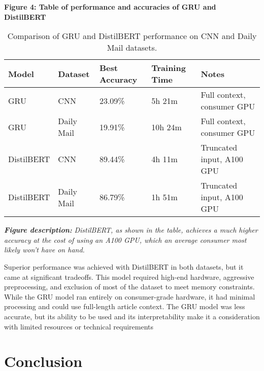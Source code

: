 \documentclass[11pt]{article}
\begin{document}
\begin{samepage}
	\begin{center}
		\textbf{Figure 4: Table of performance and accuracies of GRU and DistilBERT}
	\end{center}
	\begin{table}[h]
\begin{scriptsize}
\begin{tabularx}{\textwidth}{l l l l l}
\textbf{Model} & \textbf{Dataset} & \textbf{Best Accuracy} & \textbf{Training Time} & \textbf{Notes} \\
\hline
GRU & CNN & 23.09\% & 5h 21m & Full context, consumer GPU \\
GRU & Daily Mail & 19.91\% & 10h 24m & Full context, consumer GPU \\
DistilBERT & CNN & 89.44\% & 4h 11m & Truncated input, A100 GPU \\
DistilBERT & Daily Mail & 86.79\% & 1h 51m & Truncated input, A100 GPU \\
\end{tabularx}
\end{scriptsize}
\caption{Comparison of GRU and DistilBERT performance on CNN and Daily Mail datasets.}
\end{table}
\vspace{1em}
\noindent\begin{minipage}{0.9\linewidth}
\begin{scriptsize}
\textbf{\textit{Figure description:}} \textit{DistilBERT, as shown in the table, achieves a much higher accuracy at the cost of using an A100 GPU, which an average consumer most likely won't have on hand.}
\end{scriptsize}
\end{minipage}
\end{samepage}

    Superior performance was achieved with DistilBERT in both datasets, but
it came at significant tradeoffs. This model required high-end hardware,
aggressive preprocessing, and exclusion of most of the dataset to meet
memory constraints. While the GRU model ran entirely on consumer-grade
hardware, it had minimal processing and could use full-length article
context. The GRU model was less accurate, but its ability to be used and
its interpretability make it a consideration with limited resources or
technical requirements

    \section{Conclusion}\label{conclusion}
\end{document}
